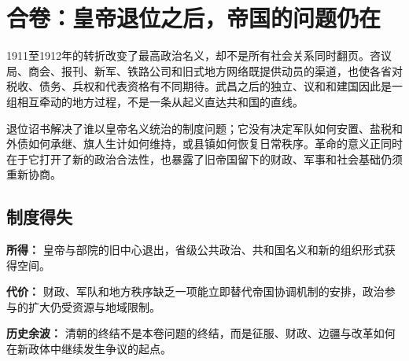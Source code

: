 \section{合卷：皇帝退位之后，帝国的问题仍在}

1911至1912年的转折改变了最高政治名义，却不是所有社会关系同时翻页。咨议局、商会、报刊、新军、铁路公司和旧式地方网络既提供动员的渠道，也使各省对税收、债务、兵权和代表资格有不同期待。武昌之后的独立、议和和建国因此是一组相互牵动的地方过程，不是一条从起义直达共和国的直线。

退位诏书解决了谁以皇帝名义统治的制度问题；它没有决定军队如何安置、盐税和外债如何承继、旗人生计如何维持，或县镇如何恢复日常秩序。革命的意义正同时在于它打开了新的政治合法性，也暴露了旧帝国留下的财政、军事和社会基础仍须重新协商。

\subsection{制度得失}

\textbf{所得：} 皇帝与部院的旧中心退出，省级公共政治、共和国名义和新的组织形式获得空间。

\textbf{代价：} 财政、军队和地方秩序缺乏一项能立即替代帝国协调机制的安排，政治参与的扩大仍受资源与地域限制。

\textbf{历史余波：} 清朝的终结不是本卷问题的终结，而是征服、财政、边疆与改革如何在新政体中继续发生争议的起点。
